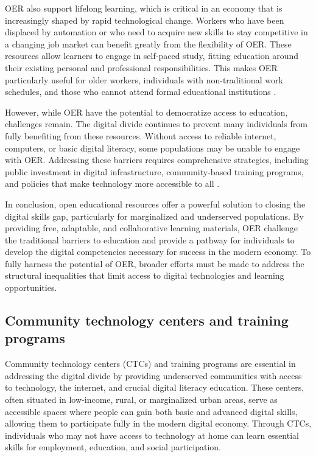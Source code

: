 \begin{refsection}
OER also support lifelong learning, which is critical in an economy that is increasingly shaped by rapid technological change. Workers who have been displaced by automation or who need to acquire new skills to stay competitive in a changing job market can benefit greatly from the flexibility of OER. These resources allow learners to engage in self-paced study, fitting education around their existing personal and professional responsibilities. This makes OER particularly useful for older workers, individuals with non-traditional work schedules, and those who cannot attend formal educational institutions \cite[pp.~120-123]{schillerdigitalcapitalism}.

However, while OER have the potential to democratize access to education, challenges remain. The digital divide continues to prevent many individuals from fully benefiting from these resources. Without access to reliable internet, computers, or basic digital literacy, some populations may be unable to engage with OER. Addressing these barriers requires comprehensive strategies, including public investment in digital infrastructure, community-based training programs, and policies that make technology more accessible to all \cite[pp.~45-48]{eubanksautomating}.

In conclusion, open educational resources offer a powerful solution to closing the digital skills gap, particularly for marginalized and underserved populations. By providing free, adaptable, and collaborative learning materials, OER challenge the traditional barriers to education and provide a pathway for individuals to develop the digital competencies necessary for success in the modern economy. To fully harness the potential of OER, broader efforts must be made to address the structural inequalities that limit access to digital technologies and learning opportunities.

\subsection{Community technology centers and training programs}

Community technology centers (CTCs) and training programs are essential in addressing the digital divide by providing underserved communities with access to technology, the internet, and crucial digital literacy education. These centers, often situated in low-income, rural, or marginalized urban areas, serve as accessible spaces where people can gain both basic and advanced digital skills, allowing them to participate fully in the modern digital economy. Through CTCs, individuals who may not have access to technology at home can learn essential skills for employment, education, and social participation.


\end{refsection}
